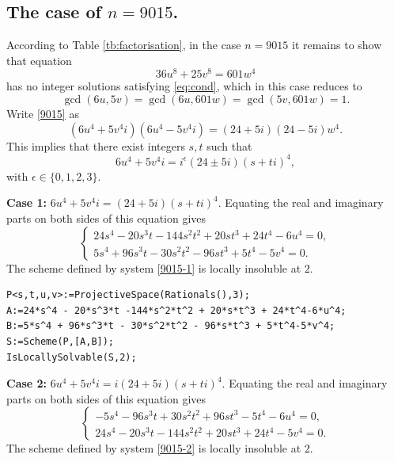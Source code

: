 \documentclass[a4paper,12pt,english,reqno]{amsart}
\begin{document}
\subsection{The case of $n=9015$.}%

 According to Table \ref{tb:factorisation}, in the case $n=9015$ it remains to
show that equation
\begin{equation}\label{9015}
36u^8+25v^8=601 w^4
\end{equation}
has no integer solutions satisfying \eqref{eq:cond}, which in this case reduces to \[\gcd(6u,5v)=\gcd(6u,601w)=\gcd(5v,601w)=1.\]
Write \eqref{9015} as 
\begin{equation} (6u^4+5v^4i)(6u^4-5v^4i)=(24+ 5i)(24- 5i)w^4.
\end{equation}
This implies that there exist integers $s,t$ such that 
\[6u^4+5v^4i=i^{\epsilon}(24\pm 5i)(s+ti)^4,\]
with $\epsilon \in \{0,1,2,3\}$.


{\bf Case 1:} $6u^4+5v^4i=(24+5i)(s+ti)^4$. Equating the real and imaginary parts on both sides of this equation gives
\begin{equation}\label{9015-1}
\begin{cases}
24s^4 - 20s^3t - 144s^2t^2 + 20st^3 + 24t^4 - 6u^4=0,\\
5s^4 + 96s^3t - 30s^2t^2 - 96st^3 + 5t^4 - 5v^4=0.
\end{cases}
\end{equation}
The scheme defined by system \eqref{9015-1} is locally insoluble at $2$.

\begin{lstlisting}
P<s,t,u,v>:=ProjectiveSpace(Rationals(),3);
A:=24*s^4 - 20*s^3*t -144*s^2*t^2 + 20*s*t^3 + 24*t^4-6*u^4;
B:=5*s^4 + 96*s^3*t - 30*s^2*t^2 - 96*s*t^3 + 5*t^4-5*v^4;
S:=Scheme(P,[A,B]);
IsLocallySolvable(S,2);
\end{lstlisting}

{\bf Case 2:} $6u^4+5v^4i=i(24+5i)(s+ti)^4$. Equating the real and imaginary parts on both sides of this equation gives
\begin{equation}\label{9015-2}
\begin{cases}
-5s^4 - 96s^3t + 30s^2t^2 + 96st^3 - 5t^4 - 6u^4=0,\\
24s^4 - 20s^3t - 144s^2t^2 + 20st^3 + 24t^4 - 5v^4=0.
\end{cases}
\end{equation}
The scheme defined by system \eqref{9015-2} is locally insoluble at $2$.
\end{document}
